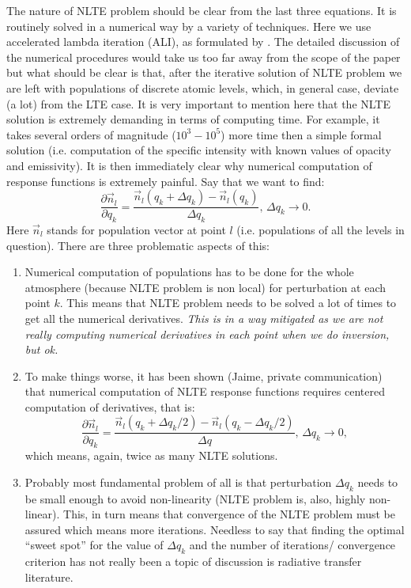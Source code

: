 \documentclass[referee]{aa}
\begin{document}
The nature of NLTE problem should be clear from the last three equations. It is routinely solved in a numerical way by a variety of techniques. Here we use accelerated lambda iteration (ALI), as formulated by \citet{RH1} \citep[for an excellent review see also][]{Hubeny03}. The detailed discussion of the numerical procedures would take us too far away from the scope of the paper but what should be clear is that, after the iterative solution of NLTE problem we are left with populations of discrete atomic levels, which, in general case, deviate (a lot) from the LTE case. It is very important to mention here that the NLTE solution is extremely demanding in terms of computing time. For example, it takes several orders of magnitude ($10^3 - 10^5$) more time then a simple formal solution (i.e. computation of the specific intensity with known values of opacity and emissivity). It is then immediately clear why numerical computation of response functions is extremely painful. Say that we want to find:
\begin{equation}
 \frac{\partial\vec{n}_l}{\partial q_k} = \frac{\vec{n}_l(q_k + \Delta q_k) - \vec{n}_l(q_k)}{\Delta q_k},\,\Delta q_k \rightarrow 0.
\end{equation}
Here $\vec{n}_l$ stands for population vector at point $l$ (i.e. populations of all the levels in question). There are three problematic aspects of this:
\begin{enumerate}
 \item Numerical computation of populations has to be done for the whole atmosphere (because NLTE problem is non local) for perturbation at each point $k$. This means that NLTE problem needs to be solved a lot of times to get all the numerical derivatives. \emph{This is in a way mitigated as we are not really computing numerical derivatives in each point when we do inversion, but ok.} 
 \item To make things worse, it has been shown (Jaime, private communication) that numerical computation of NLTE response functions requires centered computation of derivatives, that is:
 \begin{equation}
 \frac{\partial\vec{n}_l}{\partial q_k} = \frac{\vec{n}_l(q_k + \Delta q_k/2) - \vec{n}_l(q_k - \Delta q_k /2)}{\Delta q},\,\Delta q_k \rightarrow 0,
  \end{equation}
which means, again, twice as many NLTE solutions.
\item Probably most fundamental problem of all is that perturbation $\Delta q_k$ needs to be small enough to avoid non-linearity (NLTE problem is, also, highly non-linear). This, in turn means that convergence of the NLTE problem must be assured which means more iterations. Needless to say that finding the optimal ``sweet spot'' for the value of $\Delta q_k$ and the number of iterations/ convergence criterion has not really been a topic of discussion is radiative transfer literature. 
\end{enumerate}
\end{document}
